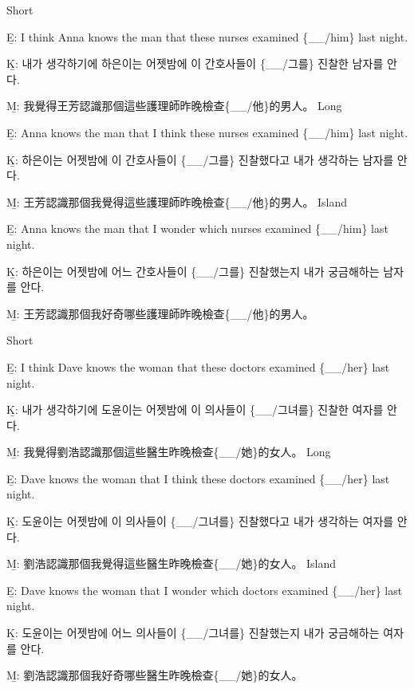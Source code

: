 \pex %
\a Short\par\nobreak
\beginsubsub
\b{E:} I think Anna knows the man that these nurses examined \{\_\_/him\} last night.\par\nobreak
\b{K:} \ko 내가 생각하기에 하은이는 어젯밤에 이 간호사들이 \{\_\_/그를\} 진찰한 남자를 안다. \normalfont\par\nobreak
\b{M:} \zh 我覺得王芳認識那個這些護理師昨晚檢查\{\_\_/他\}的男人。 \normalfont
\endsubsub
\a Long\par\nobreak
\beginsubsub
\b{E:} Anna knows the man that I think these nurses examined \{\_\_/him\} last night.\par\nobreak
\b{K:} \ko 하은이는 어젯밤에 이 간호사들이 \{\_\_/그를\} 진찰했다고 내가 생각하는 남자를 안다. \normalfont\par\nobreak
\b{M:} \zh 王芳認識那個我覺得這些護理師昨晚檢查\{\_\_/他\}的男人。 \normalfont
\endsubsub
\a Island\par\nobreak
\beginsubsub
\b{E:} Anna knows the man that I wonder which nurses examined \{\_\_/him\} last night.\par\nobreak
\b{K:} \ko 하은이는 어젯밤에 어느 간호사들이 \{\_\_/그를\} 진찰했는지 내가 궁금해하는 남자를 안다\normalfont.\par\nobreak
\b{M:} \zh 王芳認識那個我好奇哪些護理師昨晚檢查\{\_\_/他\}的男人。\normalfont
\endsubsub
\xe

\pex %
\a Short\par\nobreak
\beginsubsub
\b{E:} I think Dave knows the woman that these doctors examined \{\_\_/her\} last night.\par\nobreak
\b{K:} \ko 내가 생각하기에 도윤이는 어젯밤에 이 의사들이 \{\_\_/그녀를\} 진찰한 여자를 안다. \normalfont\par\nobreak
\b{M:} \zh 我覺得劉浩認識那個這些醫生昨晚檢查\{\_\_/她\}的女人。 \normalfont
\endsubsub
\a Long\par\nobreak
\beginsubsub
\b{E:} Dave knows the woman that I think these doctors examined \{\_\_/her\} last night.\par\nobreak
\b{K:} \ko 도윤이는 어젯밤에 이 의사들이 \{\_\_/그녀를\} 진찰했다고 내가 생각하는 여자를 안다. \normalfont\par\nobreak
\b{M:} \zh 劉浩認識那個我覺得這些醫生昨晚檢查\{\_\_/她\}的女人。 \normalfont
\endsubsub
\a Island\par\nobreak
\beginsubsub
\b{E:} Dave knows the woman that I wonder which doctors examined \{\_\_/her\} last night.\par\nobreak
\b{K:} \ko 도윤이는 어젯밤에 어느 의사들이 \{\_\_/그녀를\} 진찰했는지 내가 궁금해하는 여자를 안다\normalfont.\par\nobreak
\b{M:} \zh 劉浩認識那個我好奇哪些醫生昨晚檢查\{\_\_/她\}的女人。\normalfont
\endsubsub
\xe

